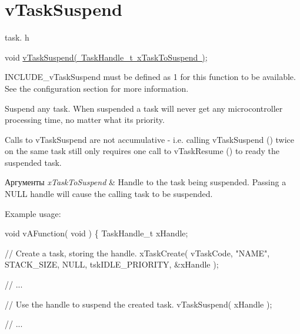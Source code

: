 \hypertarget{group__v_task_suspend}{}\section{v\+Task\+Suspend}
\label{group__v_task_suspend}
task. h 
\begin{DoxyPre}void \mbox{\hyperlink{task_8h_a84d4e660b04630be2939d91b3c2412f8}{vTaskSuspend( TaskHandle\_t xTaskToSuspend )}};\end{DoxyPre}


I\+N\+C\+L\+U\+D\+E\+\_\+v\+Task\+Suspend must be defined as 1 for this function to be available. See the configuration section for more information.

Suspend any task. When suspended a task will never get any microcontroller processing time, no matter what its priority.

Calls to v\+Task\+Suspend are not accumulative -\/ i.\+e. calling v\+Task\+Suspend () twice on the same task still only requires one call to v\+Task\+Resume () to ready the suspended task.


\begin{DoxyParams}{Аргументы}
{\em x\+Task\+To\+Suspend} & Handle to the task being suspended. Passing a N\+U\+LL handle will cause the calling task to be suspended.\\
\hline
\end{DoxyParams}
Example usage\+: 
\begin{DoxyPre}
void vAFunction( void )
\{
TaskHandle\_t xHandle;\end{DoxyPre}



\begin{DoxyPre}    // Create a task, storing the handle.
    xTaskCreate( vTaskCode, "NAME", STACK\_SIZE, NULL, tskIDLE\_PRIORITY, \&xHandle );\end{DoxyPre}



\begin{DoxyPre}    // ...\end{DoxyPre}



\begin{DoxyPre}    // Use the handle to suspend the created task.
    vTaskSuspend( xHandle );\end{DoxyPre}



\begin{DoxyPre}    // ...\end{DoxyPre}



